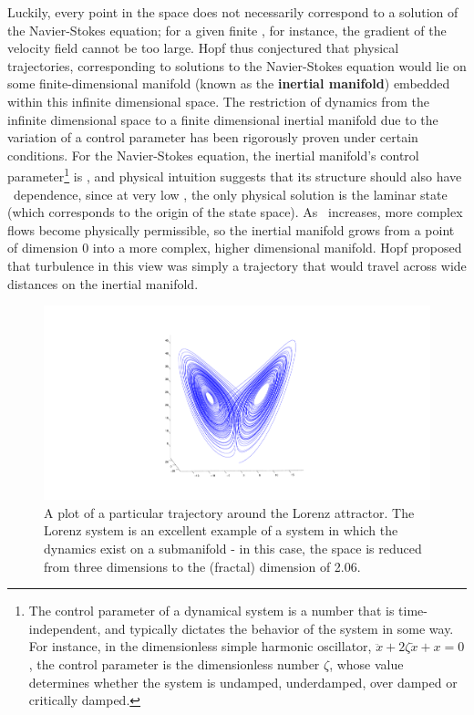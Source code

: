 {Luckily, every point in the space does not necessarily correspond to a solution of the Navier-Stokes equation; for a given finite \ReN, for instance, the gradient of the velocity field cannot be too large. Hopf thus conjectured that physical trajectories, corresponding to solutions to the Navier-Stokes equation would lie on some finite-dimensional manifold (known as the {\bf inertial manifold}) embedded within this infinite dimensional space. The restriction of dynamics from the infinite dimensional space to a finite dimensional inertial manifold due to the variation of a control parameter has been rigorously proven under certain conditions. For the Navier-Stokes equation, the inertial manifold's control parameter\footnote{The control parameter of a dynamical system is a number that is time-independent, and typically dictates the behavior of the system in some way. For instance, in the dimensionless simple harmonic oscillator, $\ddot{x} + 2\zeta \dot{x} + x = 0$, the control parameter is the dimensionless number $\zeta$, whose value determines whether the system is undamped, underdamped, over damped or critically damped.} is \ReN, and physical intuition suggests that its structure should also have \ReN~dependence, since at very low \ReN, the only physical solution is the laminar state (which corresponds to the origin of the state space). As \ReN\ increases, more complex flows become physically permissible, so the inertial manifold grows from a point of dimension 0 into a more complex, higher dimensional manifold. Hopf proposed that turbulence in this view was simply a trajectory that would travel across wide distances on the inertial manifold. \\
\begin{figure}[h]
\centerline{
\includegraphics[scale=0.5	]{Figs/LorenzAttractor}}
\caption{A plot of a particular trajectory around the Lorenz attractor. The Lorenz system is an excellent example of a system in which the dynamics exist on a submanifold - in this case, the space is reduced from three dimensions to the (fractal) dimension of 2.06. }\label{fig:LorenzAttractor}
\end{figure}

}
